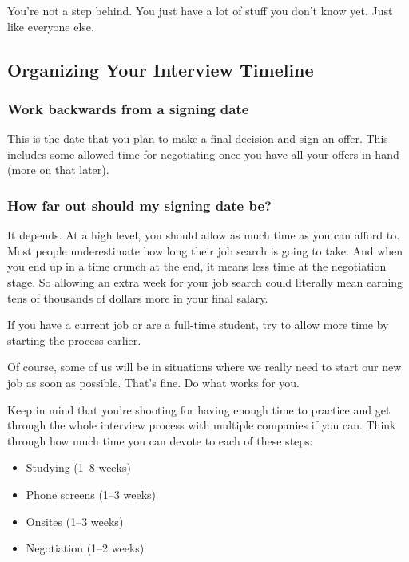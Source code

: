 \documentclass{article}
\begin{document}
You're not a step behind. You just have a lot of stuff you don't know yet. Just like everyone else.



\subsection{Organizing Your Interview Timeline}

\subsubsection{Work backwards from a signing date}

This is the date that you plan to make a final decision and sign an offer. This includes some allowed time for negotiating once you have all your offers in hand (more on that later).

\subsubsection{How far out should my signing date be?}

It depends. At a high level, you should allow as much time as you can afford to. Most people underestimate how long their job search is going to take. And when you end up in a time crunch at the end, it means less time at the negotiation stage. So allowing an extra week for your job search could literally mean earning tens of thousands of dollars more in your final salary.

If you have a current job or are a full-time student, try to allow more time by starting the process earlier.

Of course, some of us will be in situations where we really need to start our new job as soon as possible. That's fine. Do what works for you.

Keep in mind that you’re shooting for having enough time to practice and get through the whole interview process with multiple companies if you can. Think through how much time you can devote to each of these steps:

\begin{itemize}
\item Studying (1–8 weeks)
\item Phone screens (1–3 weeks)
\item Onsites (1–3 weeks)
\item Negotiation (1–2 weeks)
\end{itemize}
\end{document}

